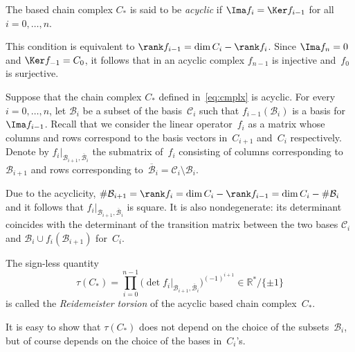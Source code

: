 \begin{definition}
\label{dfn:acycl}
The based chain complex $C_*$ is said to be \emph{acyclic} if $\Ima f_i = \Ker f_{i-1}$ for all~$i = 0, \ldots, n$.
\end{definition}

\begin{remark}
This condition is equivalent to $\rank f_{i-1} = \dim C_i - \rank f_i$. Since $\Ima f_n = 0$ and $\Ker f_{-1} = C_0$, it follows that in an acyclic complex $f_{n-1}$ is injective and~$f_0$ is surjective.
\end{remark}

Suppose that the chain complex $C_*$ def\/ined in~\eqref{eq:cmplx} is acyclic. For every $i = 0, \ldots, n$, let $\mathcal B_i$ be a subset of the basis~$\mathcal C_i$ such that $f_{i-1} (\mathcal B_i)$ is a basis for~$\Ima f_{i-1}$. Recall that we consider the linear operator~$f_i$ as a matrix whose columns and rows correspond to the basis vectors in~$C_{i+1}$ and~$C_i$ respectively. Denote by $f_i|_{\mathcal B_{i+1}, \overline{\mathcal B}_i}$ the submatrix of~$f_i$ consisting of columns corresponding to $\mathcal B_{i+1}$ and rows corresponding to~$\overline{\mathcal B}_i = \mathcal C_i \setminus \mathcal B_i$.

Due to the acyclicity, $\#\mathcal B_{i+1} = \rank f_i = \dim C_i - \rank f_{i-1} = \dim C_i - \#\mathcal B_i$ and it follows that $f_i|_{\mathcal B_{i+1}, \overline{\mathcal B}_i}$ is square. It is also nondegenerate: its determinant coincides with the determinant of the transition matrix between the two bases $\mathcal C_i$ and $\mathcal B_i \cup f_i(\mathcal B_{i+1})$ for~$C_i$.

\begin{definition}
\label{dfn:tors}
The sign-less quantity
\begin{equation}
\label{eq:torsion}
\tau(C_*) = \prod\limits_{i = 0}^{n-1} \bigl(\det f_i|_{\mathcal B_{i+1}, \overline{\mathcal B}_i}\bigr)^{(- 1)^{i+1}} \in \mathbb{R}^* / \{\pm 1\}
\end{equation}
is called the \emph{Reidemeister torsion} of the acyclic based chain complex~$C_*$.
\end{definition}

\begin{remark}
It is easy to show that $\tau(C_*)$ does not depend on the choice of the subsets~$\mathcal B_i$, but of course depends on the choice of the bases in~$C_i$'s.
\end{remark}

